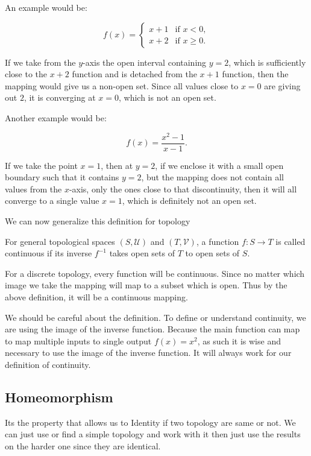 \documentclass{article}
\begin{document}
An example would be:

\[
f(x) = 
\begin{cases} 
x + 1 & \text{if } x < 0, \\
x + 2 & \text{if } x \geq 0.
\end{cases}
\]

If we take from the \( y \)-axis the open interval containing \( y = 2 \), which is sufficiently close to the \( x + 2 \) function and is detached from the \( x + 1 \) function, then the mapping would give us a non-open set. Since all values close to \( x = 0 \) are giving out \( 2 \), it is converging at \( x = 0 \), which is not an open set.

Another example would be:

\[
f(x) = \frac{x^2 - 1}{x - 1}.
\]

If we take the point \( x = 1 \), then at \( y = 2 \), if we enclose it with a small open boundary such that it contains \( y = 2 \), but the mapping does not contain all values from the \( x \)-axis, only the ones close to that discontinuity, then it will all converge to a single value \( x = 1 \), which is definitely not an open set.


We can now generalize this definition for topology 

\begin{theorem}
    For general topological spaces \((S, \mathcal{U})\) and \((T, \mathcal{V})\), a function \(f : S \to T\) is called continuous if its inverse \(f^{-1}\) takes open sets of \(T\) to open sets of \(S\).
\end{theorem}

For a discrete topology, every function will be continuous. Since no matter which image we take the mapping will map to a subset which is open. Thus by the above definition, it will be a continuous mapping. 

We should be careful about the definition. To define or understand continuity, we are using the image of the inverse function. Because the main function can map to map multiple inputs to single output \( f(x) = x^2 \), as such it is wise and necessary to use the image of the inverse function. It will always work for our definition of continuity. 

\subsection{Homeomorphism}

Its the property that allows us to Identity if two topology are same or not. We can just use or find a simple topology and work with it then just use the results on the harder one since they are identical. 
\end{document}
